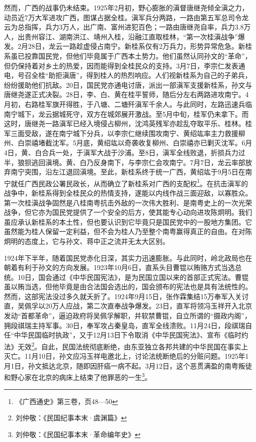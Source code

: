 然而，广西的战事仍未结束。1925年2月初，野心膨胀的滇督唐继尧倾全滇之力，动员近7万大军进攻广西，图谋占据全桂。滇军兵分两路，一路由第五军总司令龙云为总指挥，兵力3万人，出广南、富州进犯百色；一路由唐继尧自率，兵力3.8万人，出贵州容江、湖南洪江、靖州入桂，沿融江直取桂林，“第一次桂滇战争”爆发。2月28日，龙云一路趁虚侵占南宁。新桂系仅有2万兵力，形势异常危急。新桂系虽已投靠国民党，但他们毕竟属于广西本土势力。他们虽然认同孙文的“革命”，但仍保持着对乡土的热爱，因而能得到全桂民众的支持。3月7日，李宗仁发表通电，号召全桂“助拒滇唐”，得到桂人的热烈响应。人们视新桂系为自己的子弟兵，纷纷援助他们抗敌。20日，国民党亦通电讨唐，派出一部滇军支援新桂系，孙文与唐继尧遂正式决裂。28日，李、白、黄在桂平誓师，随后分左右两路进攻南宁。4月初，右路桂军旗开得胜，于八塘、二塘歼滇军千余人。与此同时，左路迅速兵临南宁城下，龙云据城死守，双方在城郊展开激战。至5月中旬，桂军仍未拿下。而这时，唐继尧一路滇军已经入境侵占柳州，沈鸿英残军亦趁乱夺取平乐、桂林。桂军三面受敌，遂在南宁城下分兵，以李宗仁继续围攻南宁、黄绍竑率主力救援柳州、白崇禧堵截沈军。5月底，黄绍竑以奇袭收复柳州、白崇禧亦已剿灭沈军。6月4日，黄、白合兵一处，于滇军大战于沙浦。至8日，滇军全线败退，折损兵力过半，狼狈逃回滇境。黄、白乃反身南下，与李宗仁会攻南宁。7月7日，龙云率部放弃南宁突围，沿左江退回滇境。至此，新桂系终于统一广西，黄绍竑于9月5日在南宁就任广西民政公署民政长，从而确立了新桂系对广西的支配权\footnote{《广西通史》第三卷，页48—50}。在抗击滇军的战争中，新桂系得到全桂民众的热情支持，遂能以内线作战三面迎敌，以寡胜众。第一次桂滇战争固然是八桂南粤抗击外敌的一次伟大胜利、是南粤史上的一次光荣战争，但它亦为国民党提供了一个安全的后方，使其能专心动向进攻陈炯明。我们虽应承认新桂系的本土性，但也要认识到它毕竟只是国民党中的一股地方集团。它虽然能为桂人保留一定利益，但不会为桂人乃至整个南粤赢得真正的自由。在对陈炯明的态度上，它与孙文、蒋中正之流并无太大区别。

1924年下半年，随着国民党赤化日深，其实力迅速膨胀。与此同时，岭北政局也在朝着有利于孙文的方向发展。1923年10月6日，直系头目曹锟以贿赂方式当选总统。10日，国会通过《中华民国宪法》，是为民国立国以来的首部正式宪法。曹锟虽以贿当选，但他毕竟是由合法国会选出的，国会颁布的宪法也是具有法统性的。然而，这部宪法没过多久就夭折了。1924年9月15日，张作霖集结15万奉军入关讨直，吴佩孚以20万人应战，第二次直奉战争爆发。23日，直军将领冯玉祥开入北京发动“首都革命”，逼迫政府将吴佩孚解职，并软禁曹锟，自立所谓的“摄政内阁”，拥段祺瑞主持军事。30日，奉军攻占秦皇岛，直军全线溃败。11月24日，段祺瑞自任“中华民国临时执政”，又于12月13日下令取消《中华民国宪法》、宣布《临时约法》无效\footnote{刘仲敬：《民国纪事本末·虞渊篇》}。自此，民国法统彻底断绝，由东亚独立各邦共建的中华民国在事实上灭亡。11月10日，孙文应冯玉祥电邀北上，讨论法统断绝后的分赃问题。1925年1月1日，孙文抵达北京，随即因肝癌一病不起。3月12日，这个恶贯满盈的南粤叛徒和野心家在北京的病床上结束了他罪恶的一生\footnote{刘仲敬：《民国纪事本末·革命编年史》}。

